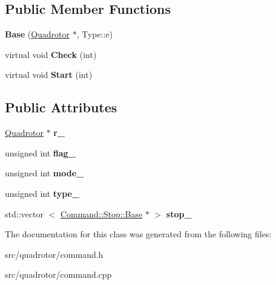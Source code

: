 \subsection*{\-Public \-Member \-Functions}
\begin{DoxyCompactItemize}
\item 
\hypertarget{classCommand_1_1Base_acfdd5eee18d39adfcbe321970d4f27fc}{{\bfseries \-Base} (\hyperlink{classQuadrotor}{\-Quadrotor} $\ast$, \-Type\-::e)}\label{classCommand_1_1Base_acfdd5eee18d39adfcbe321970d4f27fc}

\item 
\hypertarget{classCommand_1_1Base_a1a77b2acc5e0a41d1eee5ab61c2dfafd}{virtual void {\bfseries \-Check} (int)}\label{classCommand_1_1Base_a1a77b2acc5e0a41d1eee5ab61c2dfafd}

\item 
\hypertarget{classCommand_1_1Base_ab85e28c51f1601c05532d68b9a71f425}{virtual void {\bfseries \-Start} (int)}\label{classCommand_1_1Base_ab85e28c51f1601c05532d68b9a71f425}

\end{DoxyCompactItemize}
\subsection*{\-Public \-Attributes}
\begin{DoxyCompactItemize}
\item 
\hypertarget{classCommand_1_1Base_ad10b11ae9f939a0d88eec17591389106}{\hyperlink{classQuadrotor}{\-Quadrotor} $\ast$ {\bfseries r\-\_\-}}\label{classCommand_1_1Base_ad10b11ae9f939a0d88eec17591389106}

\item 
\hypertarget{classCommand_1_1Base_af73a59e7026b8f879d7bc4a8091b729c}{unsigned int {\bfseries flag\-\_\-}}\label{classCommand_1_1Base_af73a59e7026b8f879d7bc4a8091b729c}

\item 
\hypertarget{classCommand_1_1Base_a9f27c385185e92121075275d2d9b8eba}{unsigned int {\bfseries mode\-\_\-}}\label{classCommand_1_1Base_a9f27c385185e92121075275d2d9b8eba}

\item 
\hypertarget{classCommand_1_1Base_acb491ef2bb4053594e77e877aaecfade}{unsigned int {\bfseries type\-\_\-}}\label{classCommand_1_1Base_acb491ef2bb4053594e77e877aaecfade}

\item 
\hypertarget{classCommand_1_1Base_ae8f49ff59722fb70fcf4d735129ef23a}{std\-::vector\*
$<$ \hyperlink{classCommand_1_1Stop_1_1Base}{\-Command\-::\-Stop\-::\-Base} $\ast$ $>$ {\bfseries stop\-\_\-}}\label{classCommand_1_1Base_ae8f49ff59722fb70fcf4d735129ef23a}

\end{DoxyCompactItemize}


\-The documentation for this class was generated from the following files\-:\begin{DoxyCompactItemize}
\item 
src/quadrotor/command.\-h\item 
src/quadrotor/command.\-cpp\end{DoxyCompactItemize}

